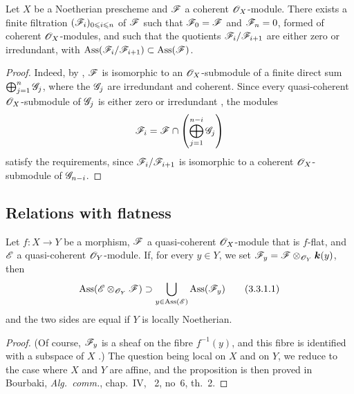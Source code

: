\begin{corollary}[3.2.8]
\label{IV.3.2.8}
Let $X$ be a Noetherian prescheme and $\mathscr{F}$ a coherent $\mathscr{O}_X$-module.
There exists a finite filtration $(\mathscr{F}_i)_{0\leqslant i\leqslant n}$ of $\mathscr{F}$ such that $\mathscr{F}_0=\mathscr{F}$ and $\mathscr{F}_n=0$, formed of coherent $\mathscr{O}_X$-modules, and such that the quotients $\mathscr{F}_i/\mathscr{F}_{i+1}$ are either zero or irredundant, with $\operatorname{Ass}(\mathscr{F}_i/\mathscr{F}_{i+1})\subset\operatorname{Ass}(\mathscr{F})$.
\end{corollary}

\begin{proof}
Indeed, by , $\mathscr{F}$ is isomorphic to an $\mathscr{O}_X$-submodule of a finite direct sum $\bigoplus_{j=1}^n\mathscr{G}_j$, where the $\mathscr{G}_j$ are irredundant and coherent.  Since every quasi-coherent $\mathscr{O}_X$-submodule of $\mathscr{G}_j$ is either zero or irredundant , the modules
\[
\mathscr{F}_i=\mathscr{F}\cap\left(\bigoplus_{j=1}^{n-i}\mathscr{G}_j\right)
\]
satisfy the requirements, since $\mathscr{F}_i/\mathscr{F}_{i+1}$ is isomorphic to a coherent $\mathscr{O}_X$-submodule of $\mathscr{G}_{n-i}$.
\end{proof}

\subsection{Relations with flatness}
\label{subsection:IV.3.3}

\begin{proposition}[3.3.1]
\label{IV.3.3.1}
Let $f:X\to Y$ be a morphism, $\mathscr{F}$ a quasi-coherent $\mathscr{O}_X$-module that is $f$-flat, and $\mathscr{E}$ a quasi-coherent $\mathscr{O}_Y$-module.
If, for every $y\in Y$, we set $\mathscr{F}_y=\mathscr{F}\otimes_{\mathscr{O}_Y}\boldsymbol{k}(y)$, then
\[
\label{IV.3.3.1.1}
\operatorname{Ass}(\mathscr{E}\otimes_{\mathscr{O}_Y}\mathscr{F})\supset\bigcup_{y\in\operatorname{Ass}(\mathscr{E})}\operatorname{Ass}(\mathscr{F}_y)
\tag{3.3.1.1}
\]
and the two sides are equal if $Y$ is locally Noetherian.
\end{proposition}

\begin{proof}
(Of course, $\mathscr{F}_y$ is a sheaf on the fibre $f^{-1}(y)$, and this fibre is identified with a subspace of $X$ .)
The question being local on $X$ and on $Y$, we reduce to the case where $X$ and $Y$ are affine, and the proposition is then proved in Bourbaki, \emph{Alg.\ comm.}, chap.~IV, \textsection~2, no~6, th.~2.
\end{proof}

